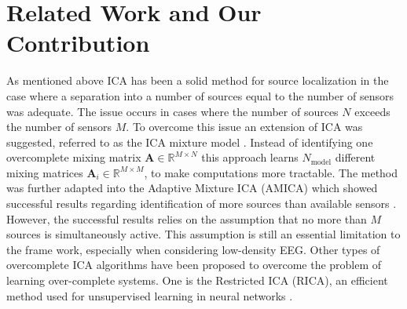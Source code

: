 \section{Related Work and Our Contribution} 
As mentioned above ICA has been a solid method for source localization in the case where a separation into a number of sources equal to the number of sensors was adequate. The issue occurs in cases where the number of sources $N$ exceeds the number of sensors $M$.  
To overcome this issue an extension of ICA was suggested, referred to as the ICA mixture model \cite{Balkan2015}.
Instead of identifying one overcomplete mixing matrix $\mathbf{A} \in \mathbb{R}^{M \times N}$ this approach learns $N_{\text{model}}$ different mixing matrices $\mathbf{A}_i \in \mathbb{R}^{M\times M}$, to make computations more tractable. 
The method was further adapted into the Adaptive Mixture ICA (AMICA) which showed successful results regarding identification of more sources than available sensors \cite{Palmer2008}. 
However, the successful results relies on the assumption that no more than $M$ sources is simultaneously active. This assumption is still an essential limitation to the frame work, especially when considering low-density EEG. 
Other types of overcomplete ICA algorithms have been proposed to overcome the problem of learning over-complete systems. 
One is the Restricted ICA (RICA), an efficient method used for unsupervised learning in neural networks \cite{Le2011}.\\ 

